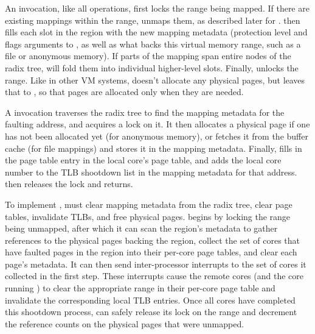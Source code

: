 
An  invocation, like all \vm operations, first locks the
range being mapped.
%
If there are existing mappings within the
range,  unmaps them, as described later for .
 then fills each slot in the region with the new mapping
metadata (protection
level and flags arguments to , as well as what backs this virtual
memory range, such as a file or anonymous memory).
%
If parts of the mapping span entire nodes of the radix tree, \vm will
fold them into individual higher-level slots.
%
Finally, \vm unlocks the range.  Like in other VM systems,
doesn't allocate any physical pages, but leaves that to ,
so that pages are allocated only when they are needed.

A  invocation traverses the radix tree to find the
mapping metadata for the faulting address, and acquires a lock on it.
It then allocates a physical page if one has not been allocated yet
(for anonymous memory), or fetches it from the buffer cache (for file
mappings) and
stores it in the mapping metadata.  Finally,  fills in the
page table entry in the local core's page table, and adds the local core
number to the TLB shootdown list in the mapping metadata for that address.
 then releases the lock and returns.

To implement , \vm must clear mapping metadata from the
radix tree, clear page tables, invalidate TLBs, and free physical
pages.   begins by locking the range being unmapped,
after which it can scan the region's metadata to gather references to
the physical pages backing the region, collect the set of cores that
have faulted pages in the region into their per-core page tables, and
clear each page's metadata.  It can then send inter-processor
interrupts to the set of cores it collected in the first step.  These
interrupts cause the remote cores (and the core running )
to clear the appropriate range in their per-core page table and
invalidate the corresponding local TLB entries.  Once all cores have
completed this shootdown process,  can safely release its
lock on the range and decrement the reference counts on the physical
pages that were unmapped.

